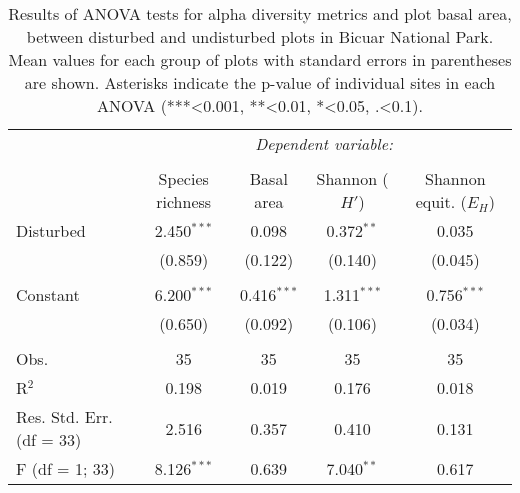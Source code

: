 
\begin{table}[!htbp] \centering 
  \caption[ANOVA statistics among disturbed and undisturbed plots in Bicuar National Park]{Results of ANOVA tests for alpha diversity metrics and plot basal area, between disturbed and undisturbed plots in Bicuar National Park. Mean values for each group of plots with standard errors in parentheses are shown. Asterisks indicate the p-value of individual sites in each ANOVA (***<0.001, **<0.01, *<0.05, .<0.1).} 
  \label{bicuar:degrad_anova_table} 
\begin{tabular}{lcccc} 
\hline
 & \multicolumn{4}{c}{\textit{Dependent variable:}} \\ 
\cline{2-5} 
\\[-1.8ex] & Species richness & Basal area & Shannon ($H'$) & Shannon equit. ($E_{H}$) \\ 
\hline
 Disturbed & 2.450$^{***}$ & 0.098 & 0.372$^{**}$ & 0.035 \\ 
  & (0.859) & (0.122) & (0.140) & (0.045) \\ 
  & & & & \\ 
 Constant & 6.200$^{***}$ & 0.416$^{***}$ & 1.311$^{***}$ & 0.756$^{***}$ \\ 
  & (0.650) & (0.092) & (0.106) & (0.034) \\ 
  & & & & \\ 
\hline
Obs. & 35 & 35 & 35 & 35 \\ 
R$^{2}$ & 0.198 & 0.019 & 0.176 & 0.018 \\ 
Res. Std. Err. (df = 33) & 2.516 & 0.357 & 0.410 & 0.131 \\ 
F (df = 1; 33) & 8.126$^{***}$ & 0.639 & 7.040$^{**}$ & 0.617 \\ 
\hline 
\end{tabular} 
\end{table} 
